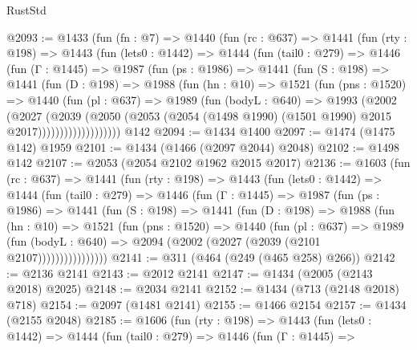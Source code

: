 \begin{lexlean}{RustStd}
\begin{coremodule}
@2093 := @1433
    (fun (fn : @7) =>
    @1440
      (fun (rc : @637) =>
      @1441
        (fun (rty : @198) =>
        @1443
          (fun (lets0 : @1442) =>
          @1444
            (fun (tail0 : @279) =>
            @1446
              (fun (Γ : @1445) =>
              @1987
                (fun (ps : @1986) =>
                @1441
                  (fun (S : @198) =>
                  @1441
                    (fun (D : @198) =>
                    @1988
                      (fun (hn : @10) =>
                      @1521
                        (fun (pns : @1520) =>
                        @1440
                          (fun (pl : @637) =>
                          @1989
                            (fun (bodyL : @640) =>
                            @1993
                              (@2002
                                (@2027
                                  (@2039
                                    (@2050
                                      (@2053
                                        (@2054
                                          (@1498 @1990)
                                          (@1501 @1990)
                                          @2015
                                          @2017)))))))))))))))))))
    @142
@2094 := @1434 @1400
@2097 := @1474 (@1475 @142) @1959
@2101 := @1434 (@1466 (@2097 @2044) @2048)
@2102 := @1498 @142
@2107 := @2053 (@2054 @2102 @1962 @2015 @2017)
@2136 := @1603
    (fun (rc : @637) =>
    @1441
      (fun (rty : @198) =>
      @1443
        (fun (lets0 : @1442) =>
        @1444
          (fun (tail0 : @279) =>
          @1446
            (fun (Γ : @1445) =>
            @1987
              (fun (ps : @1986) =>
              @1441
                (fun (S : @198) =>
                @1441
                  (fun (D : @198) =>
                  @1988
                    (fun (hn : @10) =>
                    @1521
                      (fun (pns : @1520) =>
                      @1440
                        (fun (pl : @637) =>
                        @1989
                          (fun (bodyL : @640) =>
                          @2094 (@2002 (@2027 (@2039 (@2101 @2107))))))))))))))))
@2141 := @311 (@464 (@249 (@465 @258) @266))
@2142 := @2136 @2141
@2143 := @2012 @2141
@2147 := @1434 (@2005 (@2143 @2018) @2025)
@2148 := @2034 @2141
@2152 := @1434 (@713 (@2148 @2018) @718)
@2154 := @2097 (@1481 @2141)
@2155 := @1466 @2154
@2157 := @1434 (@2155 @2048)
@2185 := @1606
    (fun (rty : @198) =>
    @1443
      (fun (lets0 : @1442) =>
      @1444
        (fun (tail0 : @279) =>
        @1446
          (fun (Γ : @1445) =>

\end{coremodule}
\end{lexlean}
